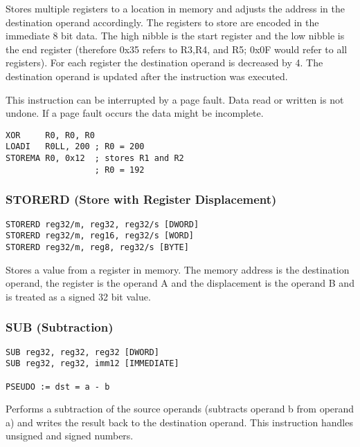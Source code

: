 
Stores multiple registers to a location in memory and adjusts the address in the destination operand accordingly. The registers
to store are encoded in the immediate 8 bit data. The high nibble is the start register and the low nibble is the end register (therefore
0x35 refers to R3,R4, and R5; 0x0F would refer to all registers). For each register the destination operand is decreased by 4. The destination operand
is updated after the instruction was executed. 


This instruction can be interrupted by a page fault. Data read or written is not undone. If a page fault occurs the data might be incomplete. 


\begin{verbatim}
XOR     R0, R0, R0
LOADI   R0LL, 200 ; R0 = 200
STOREMA R0, 0x12  ; stores R1 and R2
                  ; R0 = 192
\end{verbatim}

\subsubsection{STORERD (Store with Register Displacement)}

\begin{verbatim}
STORERD reg32/m, reg32, reg32/s [DWORD]
STORERD reg32/m, reg16, reg32/s [WORD]
STORERD reg32/m, reg8, reg32/s [BYTE]
\end{verbatim}


Stores a value from a register in memory. The memory address is the destination operand, the register is the operand A and
the displacement is the operand B and is treated as a signed 32 bit value.

\subsubsection{SUB (Subtraction)}

\begin{verbatim}
SUB reg32, reg32, reg32 [DWORD]
SUB reg32, reg32, imm12 [IMMEDIATE]

PSEUDO := dst = a - b
\end{verbatim}


Performs a subtraction of the source operands (subtracts operand b from operand a) and writes the result back to the destination operand. This instruction
handles unsigned and signed numbers.

